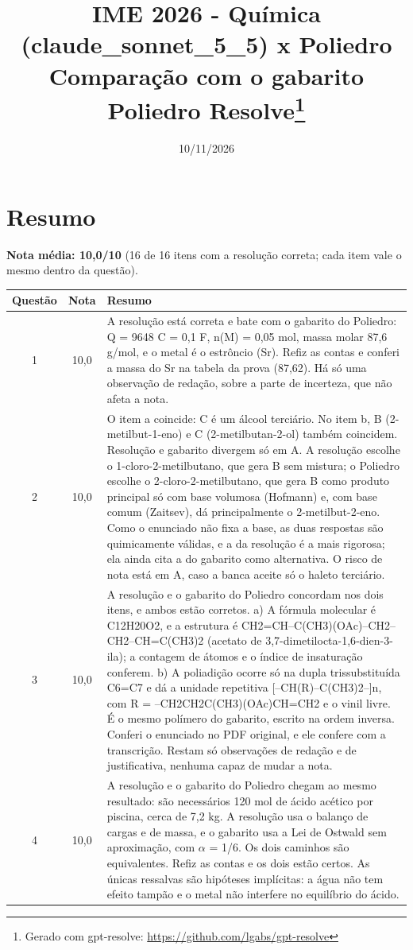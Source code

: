 \documentclass{article}%
\title{IME 2026 {-} Química (claude\_sonnet\_5\_5) x Poliedro\\[4pt]\large Comparação com o gabarito Poliedro Resolve\thanks{Gerado com gpt-resolve: \url{https://github.com/lgabs/gpt-resolve}}}%
\date{10/11/2026}%
\begin{document}
%
\normalsize%
\maketitle%
\section*{Resumo}\textbf{Nota média: 10,0/10} (16 de 16 itens com a resolução correta; cada item vale o mesmo dentro da questão).\par\medskip%
\begin{longtable}{@{}c c p{}@{}}\toprule Questão & Nota & Resumo \\ \midrule
1 & 10,0 & A resolução está correta e bate com o gabarito do Poliedro: Q = 9648 C = 0,1 F, n(M) = 0,05 mol, massa molar 87,6 g/mol, e o metal é o estrôncio (Sr). Refiz as contas e conferi a massa do Sr na tabela da prova (87,62). Há só uma observação de redação, sobre a parte de incerteza, que não afeta a nota. \\
2 & 10,0 & O item a coincide: C é um álcool terciário. No item b, B (2{-}metilbut{-}1{-}eno) e C (2{-}metilbutan{-}2{-}ol) também coincidem. Resolução e gabarito divergem só em A. A resolução escolhe o 1{-}cloro{-}2{-}metilbutano, que gera B sem mistura; o Poliedro escolhe o 2{-}cloro{-}2{-}metilbutano, que gera B como produto principal só com base volumosa (Hofmann) e, com base comum (Zaitsev), dá principalmente o 2{-}metilbut{-}2{-}eno. Como o enunciado não fixa a base, as duas respostas são quimicamente válidas, e a da resolução é a mais rigorosa; ela ainda cita a do gabarito como alternativa. O risco de nota está em A, caso a banca aceite só o haleto terciário. \\
3 & 10,0 & A resolução e o gabarito do Poliedro concordam nos dois itens, e ambos estão corretos. a) A fórmula molecular é C12H20O2, e a estrutura é CH2=CH--C(CH3)(OAc)--CH2--CH2--CH=C(CH3)2 (acetato de 3,7{-}dimetilocta{-}1,6{-}dien{-}3{-}ila); a contagem de átomos e o índice de insaturação conferem. b) A poliadição ocorre só na dupla trissubstituída C6=C7 e dá a unidade repetitiva {[}--CH(R)--C(CH3)2--{]}n, com R = --CH2CH2C(CH3)(OAc)CH=CH2 e o vinil livre. É o mesmo polímero do gabarito, escrito na ordem inversa. Conferi o enunciado no PDF original, e ele confere com a transcrição. Restam só observações de redação e de justificativa, nenhuma capaz de mudar a nota. \\
4 & 10,0 & A resolução e o gabarito do Poliedro chegam ao mesmo resultado: são necessários 120 mol de ácido acético por piscina, cerca de 7,2 kg. A resolução usa o balanço de cargas e de massa, e o gabarito usa a Lei de Ostwald sem aproximação, com $\alpha$ = 1/6. Os dois caminhos são equivalentes. Refiz as contas e os dois estão certos. As únicas ressalvas são hipóteses implícitas: a água não tem efeito tampão e o metal não interfere no equilíbrio do ácido. \\

\end{longtable}
\end{document}
